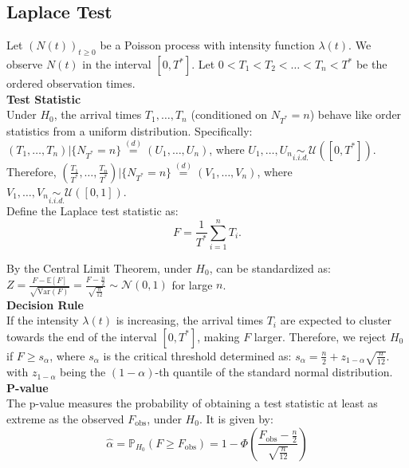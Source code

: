 \documentclass{journalstyle}
\begin{document}
\subsection{Laplace Test}

Let $(N(t))_{t \geq 0}$ be a Poisson process with intensity function $\lambda(t)$.
We observe $N(t)$ in the interval $[0, T^*]$.
Let $0 < T_1 < T_2 < \ldots < T_n < T^*$ be the ordered observation times. \\

\noindent\textbf{Test Statistic} \\
Under $H_0$, the arrival times $T_1, \ldots, T_n$ (conditioned on $N_{T^*} = n$) behave like order statistics from a uniform distribution.
Specifically: \\
$(T_1, \ldots, T_n) | \{N_{T^*} = n\} \overset{(d)}{=} (U_1, \ldots, U_n)$, where $U_1, \ldots, U_n \underset{i.i.d.}{\sim} \mathcal{U}([0, T^*])$. \\
Therefore, $(\frac{T_1}{T^*}, \ldots, \frac{T_n}{T^*}) | \{N_{T^*} = n\} \overset{(d)}{=} (V_1, \ldots, V_n)$, where $V_1, \ldots, V_n \underset{i.i.d.}{\sim} \mathcal{U}([0, 1])$. \\
Define the Laplace test statistic as: 
\begin{equation}
    F = \frac{1}{T^*} \sum_{i=1}^n T_i.
    \label{eq:laplace_test_statistic}
\end{equation}

By the Central Limit Theorem, under $H_0$,  can be standardized as: 
$Z = \frac{F - \mathbb{E}[F]}{\sqrt{\text{Var}(F)}} = \frac{F - \frac{n}{2}}{\sqrt{\frac{n}{12}}} \sim \mathcal{N}(0, 1)$
for large $n$. \\

\noindent\textbf{Decision Rule} \\
If the intensity $\lambda(t)$ is increasing, the arrival times $T_i$ are expected to cluster towards the end of the interval $[0, T^*]$, making $F$ larger.
Therefore, we reject $H_0$ if $F \geq s_{\alpha}$, where $s_{\alpha}$ is the critical threshold determined as: $s_{\alpha} = \frac{n}{2} + z_{1 - \alpha} \sqrt{\frac{n}{12}}$. \\
with $z_{1 - \alpha}$ being the $(1 - \alpha)$-th quantile of the standard normal distribution. \\

\noindent\textbf{P-value} \\
The p-value measures the probability of obtaining a test statistic at least as extreme as the observed $F_{\text{obs}}$, under $H_0$.
It is given by:
\begin{equation}
    \hat{\alpha} = \mathbb{P}_{H_0}(F \geq F_{\text{obs}}) = 1 - \Phi(\frac{F_{\text{obs}} - \frac{n}{2}}{\sqrt{\frac{n}{12}}})
    \label{eq:laplace_p_value}
\end{equation}
\end{document}

